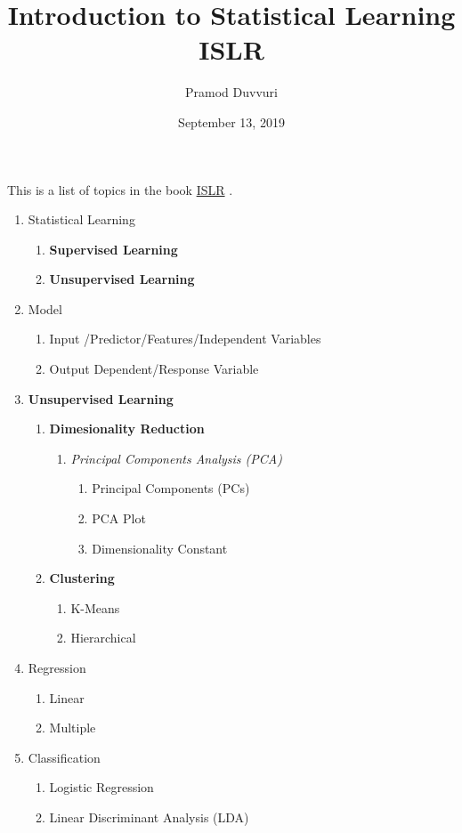 \documentclass[11pt]{article}
\title{Introduction to Statistical Learning \\
		 ISLR \tiny}
\author{Pramod Duvvuri}
\date{September 13, 2019}
\begin{document}
		\maketitle
		This is a list of topics in the book \href{http://faculty.marshall.usc.edu/gareth-james/ISL/}{ISLR} .
		\begin{enumerate} 
			\item Statistical Learning
				\begin{enumerate}
			\item \textbf{Supervised Learning}
			\item \textbf{Unsupervised Learning}
		\end{enumerate}
			\item Model
			\begin{enumerate}
				\item Input /Predictor/Features/Independent Variables
				\item Output Dependent/Response Variable
			\end{enumerate}
		\item \textbf{Unsupervised Learning}
		\begin{enumerate}
		\item \textbf{Dimesionality Reduction}
		\begin{enumerate}
			\item \textit{Principal Components Analysis (PCA)}
			\begin{enumerate}
				\item Principal Components (PCs)
				\item PCA Plot
				\item Dimensionality Constant
			\end{enumerate}
	\end{enumerate}
	    \item \textbf{Clustering}
	    \begin{enumerate}
	    	\item K-Means
	    	\item Hierarchical
	    \end{enumerate}
	\end{enumerate}
  \item Regression
  \begin{enumerate}
  	\item Linear
  	\item Multiple
  \end{enumerate}
  \item Classification
  \begin{enumerate}
  	\item Logistic Regression
  	\item Linear Discriminant Analysis (LDA)
  \end{enumerate}
	\end{enumerate}
	
\end{document}
